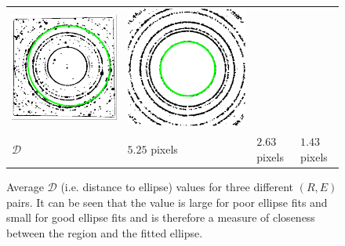 \documentclass[preprint]{iucr}              %
\begin{document}
\begin{figure}
\begin{tabular}{>{\centering\arraybackslash}m{.1\linewidth}>{\centering\arraybackslash}m{.25\linewidth}>{\centering\arraybackslash}m{.25\linewidth}>{\centering\arraybackslash}m{.25\linewidth}}
\includegraphics[width=\linewidth]{Detail/o_Si12_0001_EF_2_6.png}&
\includegraphics[width=\linewidth]{Detail/o_max1_EF_2_5.png}
\\
$\mathcal{D}$ & $5.25$ pixels & $2.63$ pixels & $1.43$ pixels
\end{tabular}

\caption{Average $\mathcal{D}$ (i.e. distance to ellipse) values for three
different $(R, E)$ pairs. It can be seen that the value is large for poor
ellipse fits and small for good ellipse fits and is therefore a measure of
closeness between the region and the fitted ellipse.}   

\label{fig:ade}
\end{figure}
\end{document}
